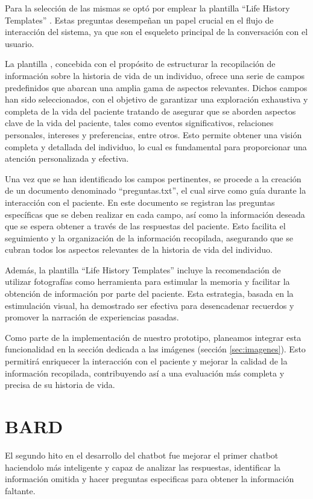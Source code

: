 Para la selección de las mismas se optó por emplear la plantilla ``Life History Templates'' \cite{dementia}. Estas preguntas desempeñan un papel crucial en el flujo de interacción del sistema, ya que son el esqueleto principal de la conversación con el usuario. 

La plantilla \cite{dementia}, concebida con el propósito de estructurar la recopilación de información sobre la historia de vida de un individuo, ofrece una serie de campos predefinidos que abarcan una amplia gama de aspectos relevantes. Dichos campos han sido seleccionados, con el objetivo de garantizar una exploración exhaustiva y completa de la vida del paciente tratando de asegurar que se aborden aspectos clave de la vida del paciente, tales como eventos significativos, relaciones personales, intereses y preferencias, entre otros. Esto permite obtener una visión completa y detallada del individuo, lo cual es fundamental para proporcionar una atención personalizada y efectiva.

Una vez que se han identificado los campos pertinentes, se procede a la creación de un documento denominado ``preguntas.txt'', el cual sirve como guía durante la interacción con el paciente. En este documento se registran las preguntas específicas que se deben realizar en cada campo, así como la información deseada que se espera obtener a través de las respuestas del paciente. Esto facilita el seguimiento y la organización de la información recopilada, asegurando que se cubran todos los aspectos relevantes de la historia de vida del individuo.

Además, la plantilla ``Life History Templates'' incluye la recomendación de utilizar fotografías como herramienta para estimular la memoria y facilitar la obtención de información por parte del paciente. Esta estrategia, basada en la estimulación visual, ha demostrado ser efectiva para desencadenar recuerdos y promover la narración de experiencias pasadas.

Como parte de la implementación de nuestro prototipo, planeamos integrar esta funcionalidad en la sección dedicada a las imágenes (sección \ref{sec:imagenes}). Esto permitirá enriquecer la interacción con el paciente y mejorar la calidad de la información recopilada, contribuyendo así a una evaluación más completa y precisa de su historia de vida. 

\section{BARD}
\label{sec:prototipoBARD}
El segundo hito en el desarrollo del chatbot fue mejorar el primer chatbot haciendolo más inteligente y capaz de analizar las respuestas, identificar la información omitida y hacer preguntas especificas para obtener la información faltante. 


